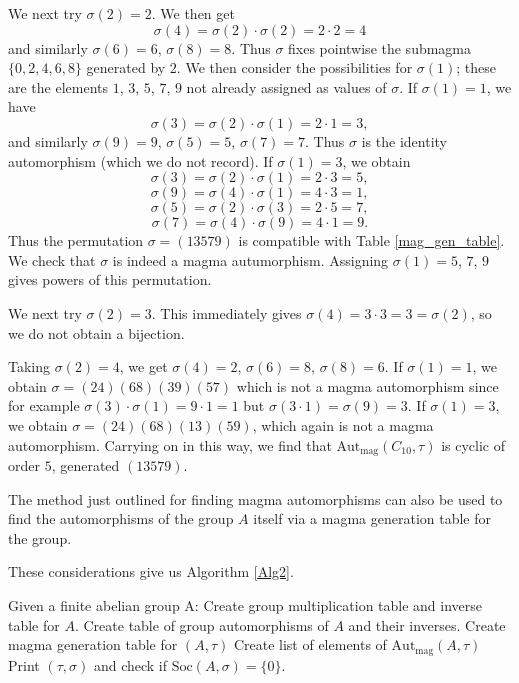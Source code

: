 \documentclass[letterpaper,12pt]{amsart}
\numberwithin{equation}{section}
\numberwithin{algorithm}{section}
\theoremstyle{definition}
\newcommand{\id}{\mathrm{id}}
\newcommand{\Soc}{\mathrm{Soc}}
\newcommand{\Autgp}{\mathrm{Aut}_{\mathrm{gp}}}
\newcommand{\Autmag}{\mathrm{Aut}_\mathrm{mag}}
\newcommand{\Symo}{\mathrm{Sym}_0}
\newcommand{\bs}{\backslash}
\begin{document}
 We next try $\sigma(2)=2$. We then get
 $$ \sigma(4) = \sigma(2) \cdot \sigma(2) = 2 \cdot 2 = 4 $$
 and similarly $\sigma(6)=6$, $\sigma(8)=8$. Thus $\sigma$ fixes pointwise the submagma $\{0,2,4,6,8\}$ generated by $2$. We then consider the possibilities for $\sigma(1)$; these are the elements $1$, $3$, $5$, $7$, $9$ not already assigned as values of $\sigma$. If $\sigma(1)=1$, we have
 $$ \sigma(3) = \sigma(2) \cdot \sigma(1) = 2 \cdot 1 = 3, $$
 and similarly $\sigma(9)=9$, $\sigma(5)=5$, $\sigma(7) =7$. Thus $\sigma$ is the identity automorphism (which we do not record). If $\sigma(1)=3$, we obtain
 $$ \sigma(3) = \sigma(2) \cdot \sigma(1) = 2 \cdot 3 = 5, $$
 $$ \sigma(9) = \sigma(4) \cdot \sigma(1) = 4 \cdot 3 =1, $$
 $$ \sigma(5) = \sigma(2) \cdot \sigma(3) = 2 \cdot 5 =7, $$
 $$ \sigma(7) = \sigma(4) \cdot \sigma(9) = 4 \cdot 1 =9. $$
 Thus the permutation $\sigma=(13579)$ is compatible with Table \ref{mag_gen_table}. We check that $\sigma$ is indeed a magma autumorphism. Assigning $\sigma(1)=5$, $7$, $9$ gives powers of this permutation.
 
 We next try $\sigma(2)=3$. This immediately gives $\sigma(4)=3 \cdot 3 = 3=\sigma(2)$, so we do not obtain a bijection.
 
 Taking $\sigma(2)=4$, we get $\sigma(4)=2$, $\sigma(6)=8$, $\sigma(8)=6$. If $\sigma(1)=1$, we obtain $\sigma=(24)(68)(39)(57)$ which is not a magma automorphism since for example $\sigma(3) \cdot \sigma(1) = 9 \cdot 1 =1$ but $\sigma(3 \cdot 1) = \sigma(9)=3$. If $\sigma(1)=3$, we obtain $\sigma=(24)(68)(13)(59)$, which again is not a magma automorphism. Carrying on in this way, we find that $\Autmag(C_{10},\tau)$ is cyclic of order $5$, generated $(13579)$. 
 
The method just outlined for finding magma automorphisms can also be used to find the automorphisms of the group $A$ itself via a magma generation table for the group.

These considerations give us Algorithm \ref{Alg2}.

\begin{algorithm}  \label{Alg2}
	\caption{Test of Conjecture \ref{main-conj} using magma generators}
	\begin{algorithmic}
		\State Given a finite abelian group A:
		\State Create group multiplication table and inverse table for $A$.
		\State Create table of group automorphisms of $A$ and their inverses.
		\For{$\tau \in \Symo(A)$}
		\If{$\Soc(A,\tau)=\{0\}$ and no $\alpha \in \Autgp(A)$ has $\alpha \tau \alpha^{-1} \prec \tau$}
		\State Create magma generation table for $(A,\tau)$
		\State Create list of elements of $\Autmag(A,\tau)$
		\For{$\sigma \in \Autmag(A,\tau) \bs \{\id\}$}
		\State Print $(\tau,\sigma)$ and check if $\Soc(A,\sigma)=\{0\}$.
		\EndFor
		\EndIf
		\EndFor
	\end{algorithmic}
\end{algorithm}
\end{document}
